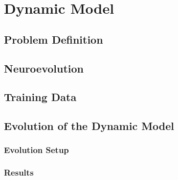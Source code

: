 \chapter{Dynamic Model}

\section{Problem Definition}

\section{Neuroevolution}

\section{Training Data}

\section{Evolution of the Dynamic Model}

\subsection{Evolution Setup}

\subsection{Results}